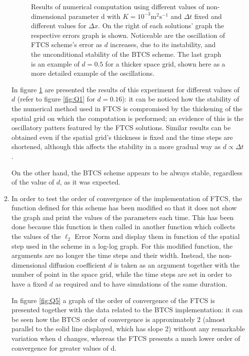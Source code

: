 \documentclass[12pt]{article}
\begin{document}
\begin{enumerate}
\begin{figure}[!tbh]
\caption{Results of numerical computation using different values of non-dimensional parameter d with $K=10^{-3}\text{m}^{2}\text{s}^{-1}$ and $\Delta t$ fixed and different values for $\Delta x$. On the right of each solutions' graph the respective errors graph is shown. Noticeable are the oscillation of FTCS scheme's error as $d$ increases, due to its instability, and the unconditional stability of the BTCS scheme. The last graph is an example of $d=0.5$ for a thicker space grid, shown here as a more detailed example of the oscillations.
\label{fig:Q4}}
\end{figure}

In figure \ref{fig:Q4} are presented the results of this experiment for different values of $d$ (refer to figure \ref{fig:Q1} for $d=0.16$): it can be noticed how the stability of the numerical method used in FTCS is compromised by the thickening of the spatial grid on which the computation is performed; an evidence of this is the oscillatory patters featured by the FTCS solutions. Similar results can be obtained even if the spatial grid's thickness is fixed and the time steps are shortened, although this affects the stability in a more gradual way as $d\propto \Delta t$. \par
On the other hand, the BTCS scheme appears to be always stable, regardless of the value of $d$, as it was expected.

\item In order to test the order of convergence of the implementation of FTCS, the function defined for this scheme has been modified so that it does not show the graph and print the values of the parameters each time. This has been done because this function is then called in another function which collects the values of the $\ell_2$ Error Norm and display them in function of the spatial step used in the scheme in a log-log graph.
For this modified function, the arguments are no longer the time steps and their width. Instead, the non-dimensional diffusion coefficient $d$ is taken as an argument together with the number of point in the space grid, while the time steps are set in order to have a fixed $d$ as required and to have simulations of the same duration.\par
In figure \ref{fig:Q5} a graph of the order of convergence of the FTCS is presented together with the data related to the BTCS implementation: it can be seen how the BTCS order of convergence is approximately 2 (almost parallel to the solid line displayed, which has slope 2) without any remarkable variation when d changes, whereas the FTCS presents a much lower order of convergence for greater values of d.


\end{enumerate}
\end{document}
